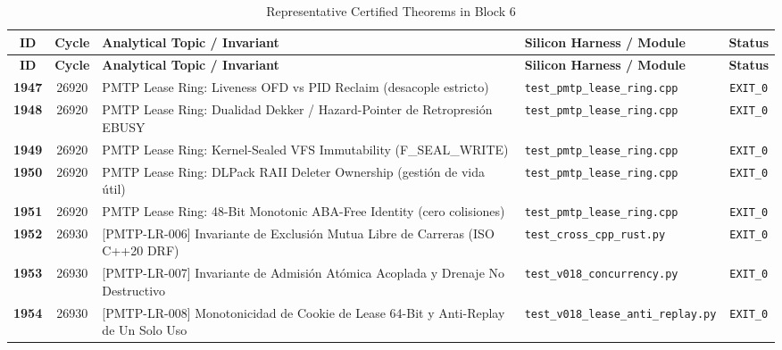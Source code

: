 \documentclass[journal,10pt,compsoc]{IEEEtran}
\theoremstyle{plain}
\theoremstyle{definition}
\begin{document}
\begin{center}
\small
\begin{longtable}{ccp{6.8cm}p{5.2cm}c}
\caption{Representative Certified Theorems in Block 6} \label{tab:theorems_block_6} \\
\toprule
\textbf{ID} & \textbf{Cycle} & \textbf{Analytical Topic / Invariant} & \textbf{Silicon Harness / Module} & \textbf{Status} \\
\midrule
\endfirsthead
\toprule
\textbf{ID} & \textbf{Cycle} & \textbf{Analytical Topic / Invariant} & \textbf{Silicon Harness / Module} & \textbf{Status} \\
\midrule
\endhead
\bottomrule
\endfoot
\textbf{1947} & 26920 & PMTP Lease Ring: Liveness OFD vs PID Reclaim (desacople estricto) \label{thm:polydim_1947} & \texttt{test\_pmtp\_lease\_ring.cpp} & \texttt{EXIT\_0} \\
\textbf{1948} & 26920 & PMTP Lease Ring: Dualidad Dekker / Hazard-Pointer de Retropresión EBUSY \label{thm:polydim_1948} & \texttt{test\_pmtp\_lease\_ring.cpp} & \texttt{EXIT\_0} \\
\textbf{1949} & 26920 & PMTP Lease Ring: Kernel-Sealed VFS Immutability (F\_SEAL\_WRITE) \label{thm:polydim_1949} & \texttt{test\_pmtp\_lease\_ring.cpp} & \texttt{EXIT\_0} \\
\textbf{1950} & 26920 & PMTP Lease Ring: DLPack RAII Deleter Ownership (gestión de vida útil) \label{thm:polydim_1950} & \texttt{test\_pmtp\_lease\_ring.cpp} & \texttt{EXIT\_0} \\
\textbf{1951} & 26920 & PMTP Lease Ring: 48-Bit Monotonic ABA-Free Identity (cero colisiones) \label{thm:polydim_1951} & \texttt{test\_pmtp\_lease\_ring.cpp} & \texttt{EXIT\_0} \\
\textbf{1952} & 26930 & [PMTP-LR-006] Invariante de Exclusión Mutua Libre de Carreras (ISO C++20 DRF) \label{thm:polydim_1952} & \texttt{test\_cross\_cpp\_rust.py} & \texttt{EXIT\_0} \\
\textbf{1953} & 26930 & [PMTP-LR-007] Invariante de Admisión Atómica Acoplada y Drenaje No Destructivo \label{thm:polydim_1953} & \texttt{test\_v018\_concurrency.py} & \texttt{EXIT\_0} \\
\textbf{1954} & 26930 & [PMTP-LR-008] Monotonicidad de Cookie de Lease 64-Bit y Anti-Replay de Un Solo Uso \label{thm:polydim_1954} & \texttt{test\_v018\_lease\_anti\_replay.py} & \texttt{EXIT\_0} \\
\bottomrule
\end{longtable}
\end{center}
\end{document}
